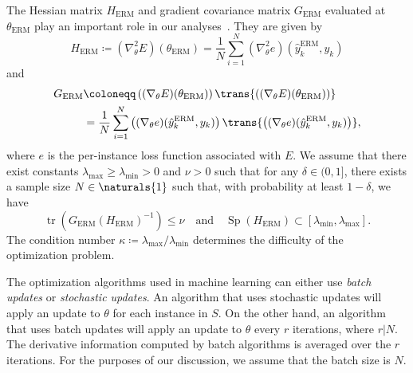 \documentclass[11pt,a4paper]{article}
\numberwithin{equation}{section}
\newcommand{\tr}{\operatorname{tr}}
\begin{document}
The Hessian matrix $H_{\text{ERM}}$ and gradient covariance matrix
$G_{\text{ERM}}$ evaluated at $\theta_{\text{ERM}}$ play an important role in
our analyses~\citep{bousquet2008tradeoffs}. They are given by
\[
	H_{\text{ERM}} \coloneqq (\nabla_\theta^2 E)(\theta_{\text{ERM}})
	= \frac{1}{N} \sum_{i = 1}^N (\nabla_\theta^2 e)(\hat{y}_k^{\text{ERM}}, y_k)
\]
and
\begin{align*}
	G_{\text{ERM}}
	&\coloneqq \left((\nabla_\theta E)(\theta_{\text{ERM}})\right)
		\trans{\left((\nabla_\theta E)(\theta_{\text{ERM}})\right)} \\
	&= \frac{1}{N} \sum_{i = 1}^N
		\left((\nabla_\theta e)(\hat{y}_k^{\text{ERM}}, y_k)\right)
		\trans{\left((\nabla_\theta e)(\hat{y}_k^{\text{ERM}}, y_k)\right)},
\end{align*}
where $e$ is the per-instance loss function associated with $E$. We assume that
there exist constants $\lambda_{\text{max}} \geq \lambda_{\text{min}} > 0$ and
$\nu > 0$ such that for any $\delta \in (0, 1]$, there exists a sample size $N
\in \naturals{1}$ such that, with probability at least $1 - \delta$, we have
\[
	\tr(G_{\text{ERM}} (H_{\text{ERM}})^{-1}) \leq \nu \quad\text{and}\quad
	\operatorname{Sp}(H_{\text{ERM}}) \subset [\lambda_{\text{min}}, \lambda_{\text{max}}].
\]
The condition number $\kappa \coloneqq
\lambda_{\text{max}}/{\lambda_{\text{min}}}$ determines the difficulty of the
optimization problem.

The optimization algorithms used in machine learning can either use \emph{batch
updates} or \emph{stochastic updates}. An algorithm that uses stochastic updates
will apply an update to $\theta$ for each instance in $S$. On the other hand, an
algorithm that uses batch updates will apply an update to $\theta$ every $r$
iterations, where $r | N$. The derivative information computed by batch
algorithms is averaged over the $r$ iterations. For the purposes of our
discussion, we assume that the batch size is $N$.
\end{document}
